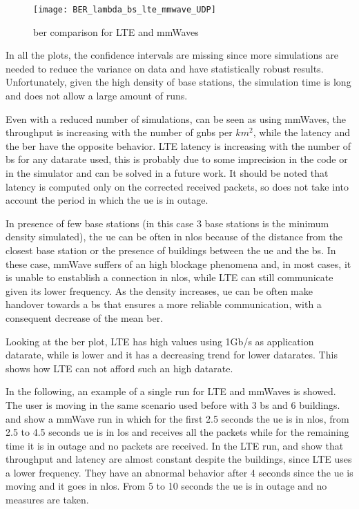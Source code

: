 \begin{figure}[ht]
  \texttt{[image: BER\_lambda\_bs\_lte\_mmwave\_UDP]}
  \caption{\gls{ber} comparison for LTE and mmWaves}
  \label{fig:mmWaves-BER}
\end{figure}

In all the plots, the confidence intervals are missing since more simulations are needed to reduce the variance on data and have statistically robust results. Unfortunately, given the high density of base stations, the simulation time is long and does not allow a large amount of runs.

Even with a reduced number of simulations, can be seen as using \gls{mmWaves}, the throughput is increasing with the number of \gls{gnb}s per $km^2$, while the latency and the \gls{ber} have the opposite behavior.
LTE latency is increasing with the number of \gls{bs} for any datarate used, this is probably due to some imprecision in the code or in the simulator and can be solved in a future work.
It should be noted that latency is computed only on the corrected received packets, so does not take into account the period in which the \gls{ue} is in outage.

In presence of few base stations (in this case 3 base stations is the minimum density simulated), the \gls{ue} can be often in \gls{nlos} because of the distance from the closest base station or the presence of buildings between the \gls{ue} and the \gls{bs}. In these case, mmWave suffers of an high blockage phenomena and, in most cases, it is unable to enstablish a connection in \gls{nlos}, while LTE can still communicate given its lower frequency. As the density increases, \gls{ue} can be often make handover towards a \gls{bs} that ensures a more reliable communication, with a consequent decrease of the mean \gls{ber}.

Looking at the \gls{ber} plot, LTE has high values using 1Gb/s as application datarate, while is lower and it has a decreasing trend for lower datarates. This shows how LTE can not afford such an high datarate.

In the following, an example of a single run for LTE and mmWaves is showed. The user is moving in the same scenario used before with 3 \gls{bs} and 6 buildings.
 and  show a mmWave run in which for the first 2.5 seconds the \gls{ue} is in \gls{nlos}, from 2.5 to 4.5 seconds \gls{ue} is in \gls{los} and receives all the packets while for the remaining time it is in outage and no packets are received.
In the LTE run,  and  show that throughput and latency are almost constant despite the buildings, since LTE uses a lower frequency. They have an abnormal behavior after 4 seconds since the \gls{ue} is moving and it goes in \gls{nlos}. From 5 to 10 seconds the \gls{ue} is in outage and no measures are taken.

